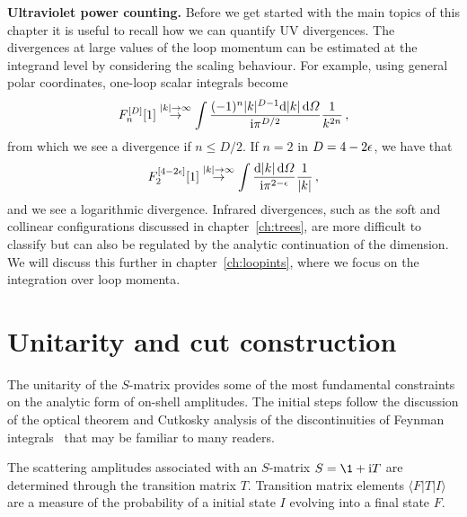 \begin{svgraybox}
  \textbf{Ultraviolet power counting.}
  Before we get started with the main topics of this chapter it is useful to recall how we can quantify UV divergences.
  The divergences at large values of the loop momentum can be estimated at the integrand level by considering the
  scaling behaviour. For example, using general polar coordinates, one-loop scalar integrals become
  \begin{equation} \label{eq:UVpowercounting}
    F_n^{[D]}[1] \overset{|k|\to\infty}{\to} \int \frac{(-1)^n |k|^{D-1} \d |k| \, \d\Omega}{\i\pi^{D/2}} \frac{1}{k^{2n}} \,,
  \end{equation}
  from which we see a divergence if $n\leq D/2$. If $n=2$ in $D=4-2\epsilon$, we have that
  \begin{equation}
    F_{2}^{[4-2\eps]}[1] \overset{|k|\to\infty}{\to} \int \frac{\d |k| \, \d\Omega}{\i\pi^{2-\eps}} \frac{1}{|k|}\,,
    \label{eq:UVcountingbubble}
  \end{equation}
  and we see a logarithmic divergence. Infrared divergences, such as the soft
  and collinear configurations discussed in chapter~\ref{ch:trees}, are more difficult to
  classify but can also be regulated by the analytic continuation of the
  dimension. We will discuss this further in chapter~\ref{ch:loopints}, where we focus on the
  integration over loop momenta. 
\end{svgraybox}

\section{Unitarity and cut construction \label{sec:3.2}}

The unitarity of the $S$-matrix provides some of the most fundamental
constraints on the analytic form of on-shell amplitudes. 
The initial steps
follow the discussion of the optical theorem and Cutkosky analysis of the
discontinuities of Feynman integrals~\cite{ch3_Cutkosky:1960sp} that may be familiar to many readers.

The scattering amplitudes associated with an $S$-matrix  $S = \1 + \i T$ are
determined through the transition matrix $T$. Transition matrix elements
$\langle F | T | I \rangle$ are a measure of the probability of a initial state $I$
evolving into a final state $F$. 

